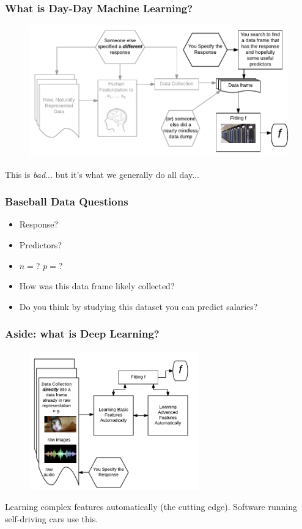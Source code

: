 \documentclass[handout]{beamer}
\begin{document}
\begin{frame}\frametitle{What is Day-Day Machine Learning?}
\begin{figure}
\centering
\includegraphics[width=4.5in]{bad_machine_learning}
\end{figure}

This is \emph{bad}... but it's what we generally do all day...
	
\end{frame}

\begin{frame}\frametitle{Baseball Data Questions}

\begin{itemize}
\item Response?
\item Predictors?
\item $n = $? $p = $?
\item How was this data frame likely collected?
\item Do you think by studying this dataset you can predict salaries?
\end{itemize}

	
\end{frame}


\begin{frame}\frametitle{Aside: what is Deep Learning?}
\begin{figure}
\centering
\includegraphics[width=2.9in]{deep_learning}
\end{figure}

Learning complex features automatically (the cutting edge). Software running self-driving cars use this.
\end{frame}
\end{document}

